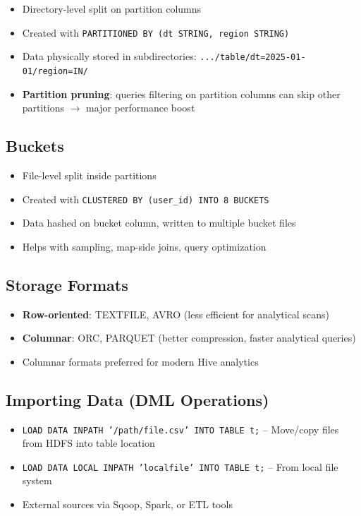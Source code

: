 \documentclass[11pt, onecolumn, a4paper]{article}
\begin{document}
\begin{itemize}
  \item Directory-level split on partition columns
  \item Created with \texttt{PARTITIONED BY (dt STRING, region STRING)}
  \item Data physically stored in subdirectories: \texttt{.../table/dt=2025-01-01/region=IN/}
  \item \textbf{Partition pruning}: queries filtering on partition columns can skip other partitions $\rightarrow$ major performance boost
\end{itemize}

\subsection{Buckets}

\begin{itemize}
  \item File-level split inside partitions
  \item Created with \texttt{CLUSTERED BY (user\_id) INTO 8 BUCKETS}
  \item Data hashed on bucket column, written to multiple bucket files
  \item Helps with sampling, map-side joins, query optimization
\end{itemize}

\subsection{Storage Formats}

\begin{itemize}
  \item \textbf{Row-oriented}: TEXTFILE, AVRO (less efficient for analytical scans)
  \item \textbf{Columnar}: ORC, PARQUET (better compression, faster analytical queries)
  \item Columnar formats preferred for modern Hive analytics
\end{itemize}

\subsection{Importing Data (DML Operations)}

\begin{itemize}
  \item \texttt{LOAD DATA INPATH '/path/file.csv' INTO TABLE t;} -- Move/copy files from HDFS into table location
  \item \texttt{LOAD DATA LOCAL INPATH 'localfile' INTO TABLE t;} -- From local file system
  \item External sources via Sqoop, Spark, or ETL tools
\end{itemize}
\end{document}

